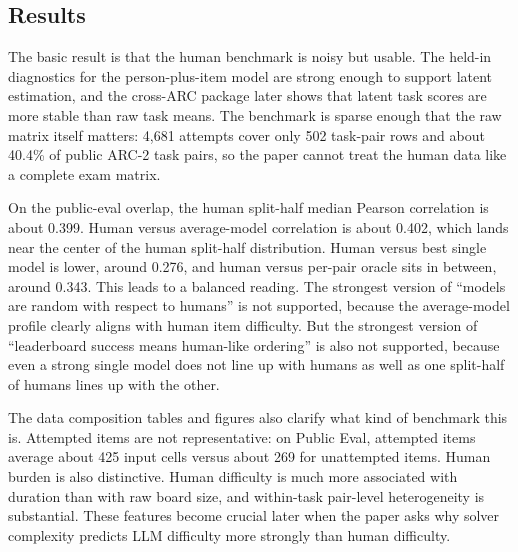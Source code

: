 \subsection{Results}

The basic result is that the human benchmark is noisy but usable. The held-in diagnostics for the person-plus-item model are strong enough to support latent estimation, and the cross-ARC package later shows that latent task scores are more stable than raw task means. The benchmark is sparse enough that the raw matrix itself matters: 4,681 attempts cover only 502 task-pair rows and about 40.4\% of public ARC-2 task pairs, so the paper cannot treat the human data like a complete exam matrix.

On the public-eval overlap, the human split-half median Pearson correlation is about 0.399. Human versus average-model correlation is about 0.402, which lands near the center of the human split-half distribution. Human versus best single model is lower, around 0.276, and human versus per-pair oracle sits in between, around 0.343. This leads to a balanced reading. The strongest version of ``models are random with respect to humans'' is not supported, because the average-model profile clearly aligns with human item difficulty. But the strongest version of ``leaderboard success means human-like ordering'' is also not supported, because even a strong single model does not line up with humans as well as one split-half of humans lines up with the other.

The data composition tables and figures also clarify what kind of benchmark this is. Attempted items are not representative: on Public Eval, attempted items average about 425 input cells versus about 269 for unattempted items. Human burden is also distinctive. Human difficulty is much more associated with duration than with raw board size, and within-task pair-level heterogeneity is substantial. These features become crucial later when the paper asks why solver complexity predicts LLM difficulty more strongly than human difficulty.

